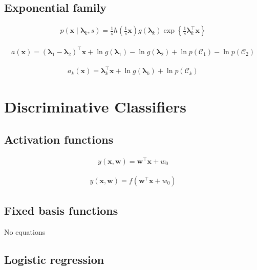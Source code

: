 \documentclass{article}
\begin{document}
\subsection{Exponential family}

\begin{align*}
p\left(\mathbf{x} \mid \boldsymbol{\lambda}_k, s\right) = \frac{1}{s} h\left( \frac{1}{s} \mathbf{x} \right) g\left( \boldsymbol{\lambda}_k \right) \exp \left\{ \frac{1}{s} \boldsymbol{\lambda}_k^{\top} \mathbf{x} \right\}
\tag{5.66}
\end{align*}

\begin{align*}
a(\mathbf{x}) = \left( \boldsymbol{\lambda}_1 - \boldsymbol{\lambda}_2 \right)^{\top} \mathbf{x} + \ln g\left( \boldsymbol{\lambda}_1 \right) - \ln g\left( \boldsymbol{\lambda}_2 \right) + \ln p\left( \mathcal{C}_1 \right) - \ln p\left( \mathcal{C}_2 \right)
\tag{5.67}
\end{align*}

\begin{align*}
a_k(\mathbf{x}) = \boldsymbol{\lambda}_k^{\top} \mathbf{x} + \ln g\left( \boldsymbol{\lambda}_k \right) + \ln p\left(\mathcal{C}_k\right)
\tag{5.68}
\end{align*}


\section{Discriminative Classifiers}

\subsection{Activation functions}

\begin{align*}
y(\mathbf{x}, \mathbf{w}) = \mathbf{w}^{\top} \mathbf{x} + w_{0}
\tag{5.69}
\end{align*}

\begin{align*}
y(\mathbf{x}, \mathbf{w}) = f\left( \mathbf{w}^{\top} \mathbf{x} + w_{0} \right)
\tag{5.70}
\end{align*}

\subsection{Fixed basis functions}

No equations

\subsection{Logistic regression}
\end{document}
